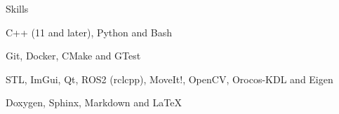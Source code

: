 \medskip
\begin{section}{Skills}
%
  \begin{skills}

    \item {}
      {C++ (11 and later), Python and Bash}

    \item {}
      {Git, Docker, CMake and GTest}

    \item {}
      {STL, ImGui, Qt, ROS2 (rclcpp), MoveIt!, OpenCV, Orocos-KDL and Eigen}

    \item {}
      {Doxygen, Sphinx, Markdown and LaTeX}



%
  \end{skills}
%
  \end{section}
